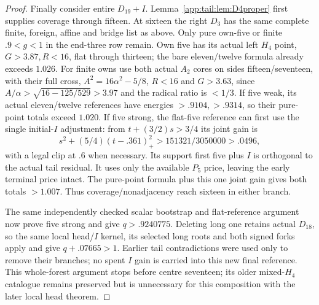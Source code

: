 \documentclass[11pt]{article}
\theoremstyle{definition}
\theoremstyle{remark}
\begin{document}
\begin{proof}
Finally consider entire $D_{19}+I$. Lemma~\ref{app:tail:lem:D4proper}
first supplies coverage through fifteen. At sixteen the right $D_3$
has the same complete finite, foreign, affine and bridge list as above.
Only pure own-five or finite $.9<g<1$ in the end-three row remain.
Own five has its actual left $H_4$ point, $G>3.87,R<16$, flat
through thirteen; the bare eleven/twelve formula already exceeds
$1.026$. For finite owns use both actual $A_2$ cores on sides
fifteen/seventeen, with their full cross, $A^2=16\alpha^2-5/8$,
$R<16$ and $G>3.63$, since
$A/\alpha>\sqrt{16-125/529}>3.97$ and the radical ratio is $<1/3$.
If five weak, its actual eleven/twelve references have energies
$>.9104,>.9314$, so their pure-point totals exceed $1.020$.
If five strong, the flat-five reference can first use the single
initial-$I$ adjustment: from $t+(3/2)s>3/4$ its joint gain is
\[
 s^2+(5/4)(t-.361)_+^2>151321/3050000>.0496,
\]
with a legal clip at $.6$ when necessary. Its support first five
plus $I$ is orthogonal to the actual tail residual. It uses only
the available $P_5$ price, leaving the early terminal price intact.
The pure-point formula plus this one joint gain gives both totals
$>1.007$. Thus coverage/nonadjacency reach sixteen in either branch.

The same independently checked scalar bootstrap and flat-reference
argument now prove five strong and give $q>.9240775$.
Deleting long one retains actual $D_{18}$, so the same local head/$I$
kernel, its selected long roots and both signed forks apply and give
$q+.07665>1$. Earlier tail contradictions were used only to remove
their branches; no spent $I$ gain is carried into this new final
reference. This whole-forest argument stops before centre seventeen;
its older mixed-$H_4$ catalogue remains preserved but is unnecessary
for this composition with the later local head theorem.
\end{proof}
\end{document}
